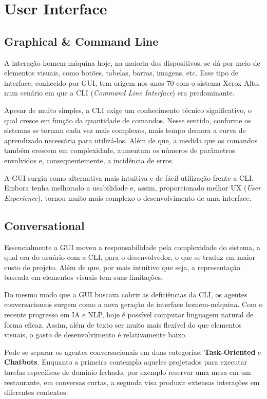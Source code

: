 \documentclass[]{politex}
\begin{document}
\section{User Interface}

\subsection{Graphical \& Command Line}

A interação homem-máquina hoje, na maioria dos dispositivos, se dá por meio de elementos visuais, como botões, tabelas, barras, imagens, etc. Esse tipo de interface, conhecido por GUI, tem origem nos anos 70 com o sistema Xerox Alto, num cenário em que a CLI (\textit{Command Line Interface}) era predominante. 

Apesar de muito simples, a CLI exige um conhecimento técnico significativo, o qual cresce em função da quantidade de comandos. Nesse sentido, conforme os sistemas se tornam cada vez mais complexos, mais tempo demora a curva de aprendizado necessária para utilizá-los. Além de que, a medida que os comandos também crescem em complexidade, aumentam os números de parâmetros envolvidos e, consequentemente, a incidência de erros.

A GUI surgiu como alternativa mais intuitiva e de fácil utilização frente a CLI. Embora tenha melhorado a usabilidade e, assim, proporcionado melhor UX (\textit{User Experience}), tornou muito mais complexo o desenvolvimento de uma interface.

\subsection{Conversational}

Essencialmente a GUI moveu a responsabilidade pela complexidade do sistema, a qual era do usuário com a CLI, para o desenvolvedor, o que se traduz em maior custo de projeto. Além de que, por mais intuitivo que seja, a representação baseada em elementos visuais tem suas limitações.

Do mesmo modo que a GUI buscava cobrir as deficiências da CLI, os agentes conversacionais surgem como a nova geração de interface homem-máquina. Com o recente progresso em IA e NLP, hoje é possível computar linguagem natural de forma eficaz. Assim, além de texto ser muito mais flexível do que elementos visuais, o gasto de desenvolvimento é relativamente baixo. 

Pode-se separar os agentes conversacionais em duas categorias: \textbf{Task-Oriented} e \textbf{Chatbots}. Enquanto a primeira contempla aqueles projetados para executar tarefas específicas de domínio fechado, por exemplo reservar uma mesa em um restaurante, em conversas curtas, a segunda visa produzir extensas interações em diferentes contextos. 
\end{document}
